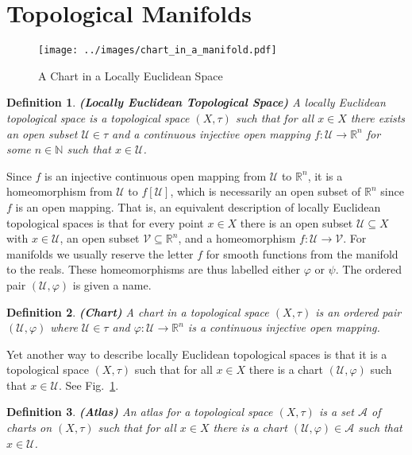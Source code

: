 \documentclass{article}
\theoremstyle{plain}
\theoremstyle{normal}
\newtheorem{definition}{Definition}[section]
\begin{document}
    \section{Topological Manifolds}
        \begin{figure}
            \centering
            \texttt{[image: ../images/chart\_in\_a\_manifold.pdf]}
            \caption{A Chart in a Locally Euclidean Space}
            \label{fig:chart_in_a_manifold}
        \end{figure}
        \begin{definition}{\textbf{(Locally Euclidean Topological Space)}}
            A locally Euclidean topological space is a topological space
            $(X,\tau)$ such that for all $x\in{X}$ there exists an open
            subset $\mathcal{U}\in\tau$ and a continuous injective open
            mapping $f:\mathcal{U}\rightarrow\mathbb{R}^{n}$ for some
            $n\in\mathbb{N}$ such that $x\in\mathcal{U}$.
        \end{definition}
        Since $f$ is an injective continuous open mapping from $\mathcal{U}$ to
        $\mathbb{R}^{n}$, it is a homeomorphism from $\mathcal{U}$ to
        $f[\mathcal{U}]$, which is necessarily an open subset of
        $\mathbb{R}^{n}$ since $f$ is an open mapping. That is, an equivalent
        description of locally Euclidean topological spaces is that for every
        point $x\in{X}$ there is an open subset $\mathcal{U}\subseteq{X}$ with
        $x\in\mathcal{U}$, an open subset $\mathcal{V}\subseteq\mathbb{R}^{n}$,
        and a homeomorphism $f:\mathcal{U}\rightarrow\mathcal{V}$. For manifolds
        we usually reserve the letter $f$ for smooth functions from the manifold
        to the reals. These homeomorphisms are thus labelled either $\varphi$ or
        $\psi$. The ordered pair $(\mathcal{U},\varphi)$ is given a name.
        \begin{definition}{\textbf{(Chart)}}
            A chart in a topological space $(X,\tau)$ is an ordered pair
            $(\mathcal{U},\varphi)$ where $\mathcal{U}\in\tau$ and
            $\varphi:\mathcal{U}\rightarrow\mathbb{R}^{n}$ is a continuous
            injective open mapping.
        \end{definition}
        Yet another way to describe locally Euclidean topological spaces is that
        it is a topological space $(X,\tau)$ such that for all $x\in{X}$ there
        is a chart $(\mathcal{U},\varphi)$ such that $x\in\mathcal{U}$.
        See Fig.~\ref{fig:chart_in_a_manifold}.
        \begin{definition}{\textbf{(Atlas)}}
            An atlas for a topological space $(X,\tau)$ is a set
            $\mathcal{A}$ of charts on $(X,\tau)$ such that for all
            $x\in{X}$ there is a chart $(\mathcal{U},\varphi)\in\mathcal{A}$
            such that $x\in\mathcal{U}$.
        \end{definition}
\end{document}
